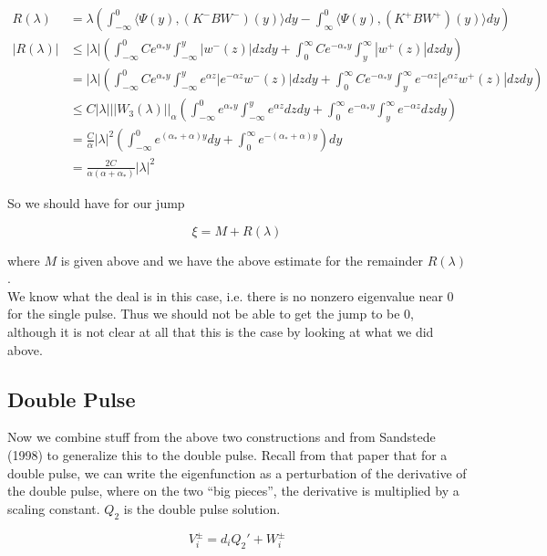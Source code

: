 \documentclass[12pt]{article}
\begin{document}
\begin{align*}
R(\lambda) &= \lambda\left( \int_{-\infty}^0 \langle \Psi(y), (K^- B W^-)(y) \rangle dy - \int_\infty^0 \langle \Psi(y), (K^+ B W^+)(y) \rangle dy \right) \\
|R(\lambda)| &\leq |\lambda|\left( \int_{-\infty}^0 C e^{\alpha_* y} \int_{-\infty}^y |w^-(z)| dz dy + \int_0^\infty C e^{-\alpha_* y} \int_y^\infty |w^+(z)| dz dy \right) \\
&= |\lambda|\left( \int_{-\infty}^0 C e^{\alpha_* y} \int_{-\infty}^y e^{\alpha z} |e^{-\alpha z} w^-(z)| dz dy + \int_0^\infty C e^{-\alpha_* y} \int_y^\infty e^{-\alpha z} |e^{\alpha z}w^+(z)| dz dy \right)\\
&\leq C |\lambda| ||W_3(\lambda)||_\alpha \left( \int_{-\infty}^0 e^{\alpha_* y} \int_{-\infty}^y e^{\alpha z} dz dy + \int_0^\infty e^{-\alpha_* y} \int_y^\infty e^{-\alpha z} dz dy \right)\\
&= \frac{C}{\alpha} |\lambda|^2 \left( \int_{-\infty}^0 e^{(\alpha_* + \alpha) y} dy + \int_0^\infty e^{-(\alpha_* + \alpha) y} \right) dy \\
&= \frac{2 C}{\alpha(\alpha + \alpha_*)} |\lambda|^2 
\end{align*}

So we should have for our jump

\[
\xi = M + R(\lambda)
\]

where $M$ is given above and we have the above estimate for the remainder $R(\lambda)$.\\

We know what the deal is in this case, i.e. there is no nonzero eigenvalue near 0 for the single pulse. Thus we should not be able to get the jump to be 0, although it is not clear at all that this is the case by looking at what we did above.

\subsection*{Double Pulse}

Now we combine stuff from the above two constructions and from Sandstede (1998) to generalize this to the double pulse. Recall from that paper that for a double pulse, we can write the eigenfunction as a perturbation of the derivative of the double pulse, where on the two ``big pieces'', the derivative is multiplied by a scaling constant. $Q_2$ is the double pulse solution.

\[
V_i^\pm = d_i Q_2' + W_i^\pm 
\]
\end{document}
